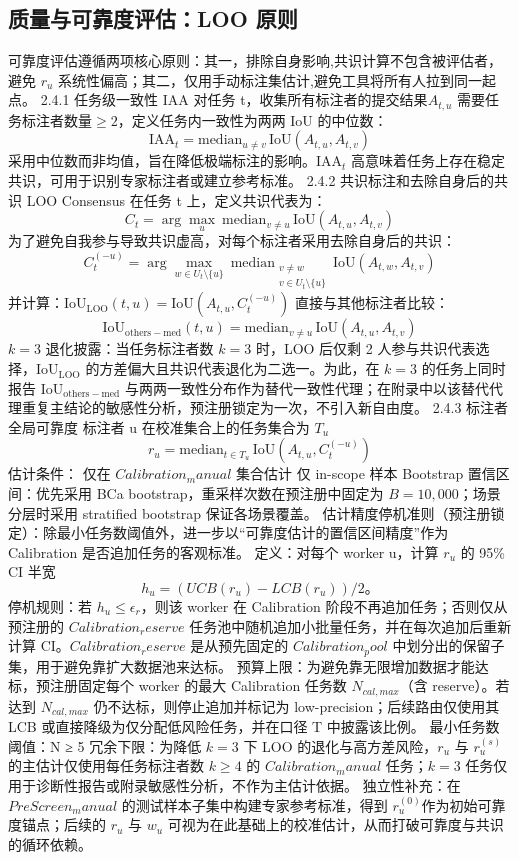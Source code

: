 \documentclass[journal,onecolumn]{IEEEtran}
\begin{document}
\subsection{质量与可靠度评估：LOO 原则}

可靠度评估遵循两项核心原则：其一，排除自身影响,共识计算不包含被评估者，避免 $r_u$ 系统性偏高；其二，仅用手动标注集估计,避免工具将所有人拉到同一起点。
2.4.1 任务级一致性 $\mathrm{IAA}$
对任务 t，收集所有标注者的提交结果$A_{t,u}$ 需要任务标注者数量$\geq2$，定义任务内一致性为两两 IoU 的中位数：
\[\mathrm{IAA}_t=\mathrm{median}_{u\neq v}\,\mathrm{IoU}\left(A_{t,u},A_{t,v}\right)\]
采用中位数而非均值，旨在降低极端标注的影响。$\mathrm{IAA}_t$ 高意味着任务上存在稳定共识，可用于识别专家标注者或建立参考标准。
2.4.2 共识标注和去除自身后的共识 LOO Consensus
在任务 t 上，定义共识代表为：
\[C_t=\arg\max_{u}\ \mathrm{median}_{v\neq u}\,\mathrm{IoU}\left(A_{t,u},A_{t,v}\right)\]
为了避免自我参与导致共识虚高，对每个标注者采用去除自身后的共识：
\[C_t^{\left(-u\right)}=\arg\max_{w\in U_t\setminus\{u\}}\ \mathrm{median}_{\substack{v\neq w\\ v\in U_t\setminus\{u\}}}\,\mathrm{IoU}\left(A_{t,w},A_{t,v}\right)\]
并计算：$\mathrm{IoU}_{\mathrm{LOO}}\left(t,u\right)=\mathrm{IoU}\left(A_{t,u},C_t^{\left(-u\right)}\right)$
直接与其他标注者比较：
\[\mathrm{IoU}_{\mathrm{others-med}}\left(t,u\right)=\mathrm{median}_{v\neq u}\,\mathrm{IoU}\left(A_{t,u},A_{t,v}\right)\]
$k=3$ 退化披露：当任务标注者数 $k=3$ 时，LOO 后仅剩 2 人参与共识代表选择，$\mathrm{IoU}_{\mathrm{LOO}}$ 的方差偏大且共识代表退化为二选一。为此，在 $k=3$ 的任务上同时报告 $\mathrm{IoU}_{\mathrm{others-med}}$ 与两两一致性分布作为替代一致性代理；在附录中以该替代代理重复主结论的敏感性分析，预注册锁定为一次，不引入新自由度。
2.4.3 标注者全局可靠度
标注者 u 在校准集合上的任务集合为 $T_u$
\[r_u=\mathrm{median}_{t\in T_u}\,\mathrm{IoU}\left(A_{t,u},C_t^{\left(-u\right)}\right)\]
估计条件：
仅在 $Calibration_manual$ 集合估计
仅 in-scope 样本
Bootstrap 置信区间：优先采用 BCa bootstrap，重采样次数在预注册中固定为 $B=10,000$；场景分层时采用 stratified bootstrap 保证各场景覆盖。
估计精度停机准则（预注册锁定）：除最小任务数阈值外，进一步以“可靠度估计的置信区间精度”作为 Calibration 是否追加任务的客观标准。
定义：对每个 worker u，计算 $r_u$ 的 95\% CI 半宽
\[h_u=\left(UCB\left(r_u\right)-LCB\left(r_u\right)\right)/2 。\]
停机规则：若 $h_u\le\epsilon_r$，则该 worker 在 Calibration 阶段不再追加任务；否则仅从预注册的 $Calibration_reserve$ 任务池中随机追加小批量任务，并在每次追加后重新计算 CI。$Calibration_reserve$ 是从预先固定的 $Calibration_pool$ 中划分出的保留子集，用于避免靠扩大数据池来达标。
预算上限：为避免靠无限增加数据才能达标，预注册固定每个 worker 的最大 Calibration 任务数 $N_{cal,max}$（含 reserve）。若达到 $N_{cal,max}$ 仍不达标，则停止追加并标记为 low-precision；后续路由仅使用其 LCB 或直接降级为仅分配低风险任务，并在口径 T 中披露该比例。
最小任务数阈值：N ≥ 5
冗余下限：为降低 $k=3$ 下 LOO 的退化与高方差风险，$r_u$ 与 $r_u^{\left(s\right)}$ 的主估计仅使用每任务标注者数 $k\geq4$ 的 $Calibration_manual$ 任务；$k=3$ 任务仅用于诊断性报告或附录敏感性分析，不作为主估计依据。
独立性补充：在 $PreScreen_manual$ 的测试样本子集中构建专家参考标准，得到 $r_u^{\left(0\right)}$作为初始可靠度锚点；后续的 $r_u$ 与 $w_u$ 可视为在此基础上的校准估计，从而打破可靠度与共识的循环依赖。
\end{document}
